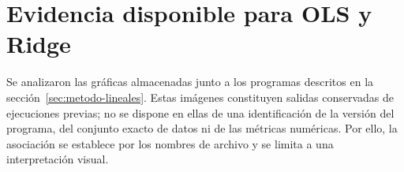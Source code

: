 \section{Evidencia disponible para OLS y Ridge}

Se analizaron las gráficas almacenadas junto a los programas descritos en la sección~\ref{sec:metodo-lineales}. Estas imágenes constituyen salidas conservadas de ejecuciones previas; no se dispone en ellas de una identificación de la versión del programa, del conjunto exacto de datos ni de las métricas numéricas. Por ello, la asociación se establece por los nombres de archivo y se limita a una interpretación visual.




